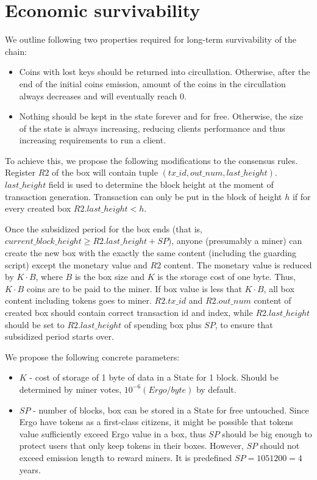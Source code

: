 \section{Economic survivability}

We outline following two properties required for long-term survivability of the chain:

\begin{itemize}
    \item{} Coins with lost keys should be returned into circullation.
    Otherwise, after the end of the initial coins emission, amount of the coins
    in the circullation always decreases and will eventually reach 0.
    \item{} Nothing should be kept in the state forever and for free.
    Otherwise, the size of the state is always increasing, reducing clients performance
    and thus increasing requirements to run a client.
\end{itemize}

To achieve this, we propose the following modifications to the consensus rules.
Register $R2$ of the box will contain tuple $(tx\_id, out\_num,
last\_height)$. $last\_height$ field is used to determine the block height
at the moment of transaction generation. Transaction can only be put in the
block of height $h$ if for every created box $R2.last\_height < h$.

Once the subsidized period for the box ends (that is,
$current\_block\_height \ge R2.last\_height + SP$), anyone (presumably a miner) can
create the new box with the exactly the same content (including the guarding
script) except the monetary value and $R2$ content. The monetary value is
reduced by $K \cdot B$, where $B$ is the box size and $K$ is the storage cost of one byte.
Thus, $K \cdot B$ coins are to be paid to the miner.
If box value is less that $K \cdot B$, all box content including tokens goes to miner.
$R2.tx\_id$ and $R2.out\_num$ content of created box should contain correct transaction id
and index, while $R2.last\_height$ should be set to $R2.last\_height$ of spending box
plus $SP$, to ensure that subsidized period starts over.

We propose the following concrete parameters:
\begin{itemize}
    \item{} $K$ - cost of storage of 1 byte of data in a State for 1 block.
    Should be determined by miner votes, $10^{-6} (Ergo/byte)$ by default.
    \item{} $SP$ - number of blocks, box can be stored in a State for free untouched.
    Since Ergo have tokens as a first-class citizens, it might be possible that tokens value
    sufficiently exceed Ergo value in a box, thus $SP$ should be big enough to protect users
    that only keep tokens in their boxes.
    However, $SP$ should not exceed emission length to reward miners.
    It is predefined $SP = 1051200 = 4$ years.
\end{itemize}